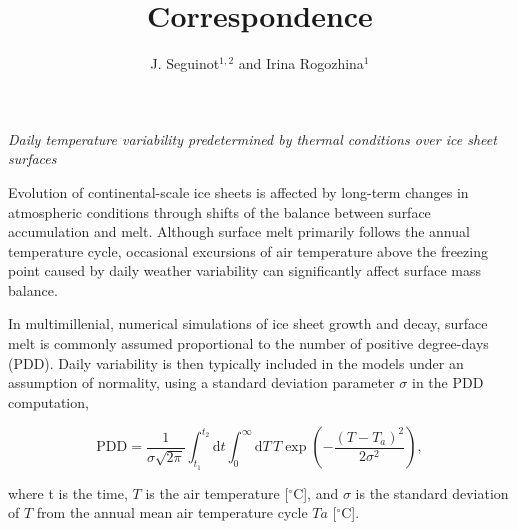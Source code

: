 \documentclass[review]{igs}
\begin{document}
\title[Correspondence]{Correspondence}
\author[J. Seguinot and I. Rogozhina]{J. Seguinot$^{1,2}$ and Irina Rogozhina$^1$}

\maketitle


\emph{Daily temperature variability predetermined by thermal conditions over ice sheet surfaces}

Evolution of continental-scale ice sheets is affected by long-term changes in atmospheric conditions through shifts of the balance between surface accumulation and melt. Although surface melt primarily follows the annual temperature cycle, occasional excursions of air temperature above the freezing point caused by daily weather variability can significantly affect surface mass balance.

In multimillenial, numerical simulations of ice sheet growth and decay, surface melt is commonly assumed proportional to the number of positive degree-days (PDD). Daily variability is then typically included in the models under an assumption of normality, using a standard deviation parameter $\sigma$ in the PDD computation,

\begin{equation} \label{eq:reeh}
  \mathrm{PDD} = \frac{1}{\sigma\sqrt{2\pi}}
    \int_{t_1}^{t_2} \mathrm{d}t
    \int_{0}^{\infty} \mathrm{d}T \,
    T \exp\left({-\frac{(T-T_a)^2}{2\sigma^2}}\right),
\end{equation}

where t is the time, $T$ is the air temperature [$^\circ$C], and $\sigma$ is the standard deviation of $T$ from the annual mean air temperature cycle $Ta$ [$^\circ$C].
\end{document}
